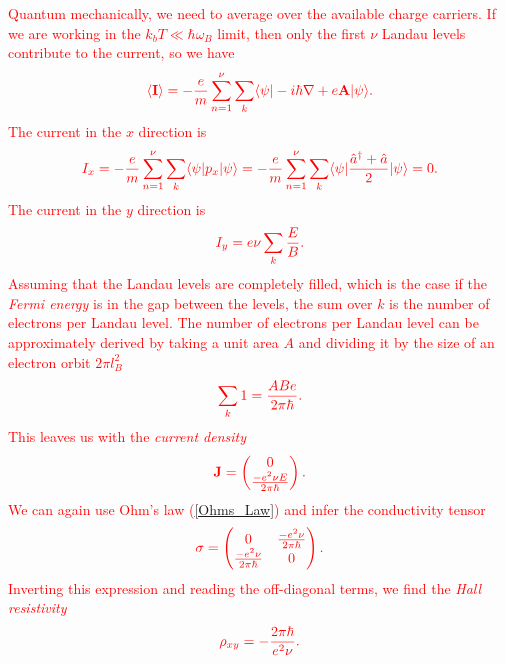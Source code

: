  \textcolor{red}{ Quantum mechanically, we need to average over the available charge carriers. If we are working in the $k_b T \ll \hbar \omega_B$ limit, then only the first $\nu$ Landau levels contribute to the current, so we have}
\begin{align}
    \textcolor{red}{ \langle {\bf I} \rangle = - \frac{e}{m} \sum_{n=1}^{\nu} \sum_{k}  \langle \psi |-i \hbar \nabla +e \bf{A} |\psi \rangle.}
\end{align}
 \textcolor{red}{ The current in the $x$ direction is }
\begin{align}
    \textcolor{red}{ I_x = -\frac{e}{m} \sum_{n=1}^{\nu} \sum_{k} \langle \psi|p_x | \psi \rangle= -\frac{e}{m} \sum_{n=1}^{\nu} \sum_{k} \langle \psi| \frac{\hat{a}^{\dagger}+ \hat{a}}{2} | \psi \rangle=0.}
\end{align}
 \textcolor{red}{The current in the $y$ direction is}
\begin{align}
    \textcolor{red}{ I_y = e \nu \sum_{k} \frac{E}{B}.}
\end{align}
 \textcolor{red}{ Assuming that the Landau levels are completely filled, which is the case if the \textit{Fermi energy} is in the gap between the levels, the sum over $k$ is the number of electrons per Landau level. The number of electrons per Landau level can be approximately derived by taking a unit area $A$ and dividing it by the size of an electron orbit $2 \pi l_B^2$ }
\begin{align}
    \textcolor{red}{ \sum_{k}1 =  \frac{A B e}{2 \pi \hbar}.}
\end{align}
 \textcolor{red}{ This leaves us with the \textit{current density}}
\begin{align}
  \textcolor{red}{  {\bf J} = \begin{pmatrix} 
0\\
        \frac{-e^2 \nu E}{2 \pi \hbar}
    \end{pmatrix}.}
\end{align}
 \textcolor{red}{ We can again use Ohm's law (\ref{Ohms_Law}) and infer the conductivity tensor}
\begin{align}
    \textcolor{red}{  \sigma = \begin{pmatrix}
        0&\frac{- e^2 \nu }{2\pi \hbar}\\
        \frac{- e^2 \nu }{2\pi \hbar}&0
    \end{pmatrix}.}
\end{align}
 \textcolor{red}{ Inverting this expression and reading the off-diagonal terms, we find the \textit{Hall resistivity} }
\begin{align}
    \textcolor{red}{ \rho_{xy} = - \frac{2 \pi \hbar}{e^2 \nu}.}
\end{align}


